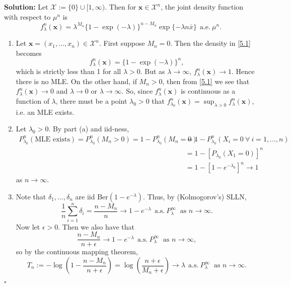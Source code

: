 \documentclass[12pt]{article}
\newcounter{ProofCounter}
\newenvironment{Solution}{\stepcounter{ProofCounter}\textbf{Solution:}}{\hfill$\square$}
\begin{document}
\begin{Solution}
  Let $\mathcal{X} := \{0\} \cup [1,\infty)$. Then for $\bm{x} \in \mathcal{X}^n$, the joint density function with respect to $\mu^n$ is 
  \begin{equation}
    f_{\lambda}^n(\bm{x}) = \lambda^{M_n}\{1 - \exp(-\lambda)\}^{n-M_n}\exp\{-\lambda n\bar{x}\} \ \ \text{a.e.} \ \mu^n.
    \label{5.1}
  \end{equation}
  \begin{enumerate}[label=(\alph*),leftmargin=6mm]
    \item Let $\bm{x} = (x_1, \dots, x_n) \in \mathcal{X}^n$. First suppose $M_n = 0$. Then the density in \eqref{5.1} becomes
      \[
        f_{\lambda}^n(\bm{x}) = \{1 - \exp(-\lambda)\}^n,
      \]
      which is strictly less than 1 for all $\lambda > 0$.
      But as $\lambda \rightarrow \infty$, $f_{\lambda}^n(\bm{x}) \rightarrow 1$. Hence there is no MLE.
      On the other hand, if $M_n > 0$, then from \eqref{5.1} we see that $f_{\lambda}^n(\bm{x}) \rightarrow 0$ and $\lambda \rightarrow 0$ or $\lambda
      \rightarrow \infty$. So, since $f_{\lambda}^n(\bm{x})$ is continuous as a function of $\lambda$, there must be a point $\lambda_0 > 0$ that
      $f_{\lambda_0}^n(\bm{x}) = \sup_{\lambda > 0}f_{\lambda}^n(\bm{x})$, i.e. an MLE exists.

    \item Let $\lambda_0 > 0$. By part (a) and iid-ness,
      \begin{align*}
        P_{\lambda_0}^n\left( \text{MLE exists} \right) = P_{\lambda_0}^n(M_n > 0) = 1 - P_{\lambda_0}^n(M_n = 0) & = 1 - P_{\lambda_0}^n(X_i = 0 \
        \forall \ i = 1,\dots, n) \\
        & = 1 - \left[ P_{\lambda_0}(X_1 = 0) \right]^{n} \\
        & = 1 - \left[ 1 - e^{-\lambda_0} \right]^{n} \longrightarrow 1
      \end{align*}
      as $n \rightarrow \infty$.

    \item Note that $\delta_1, \dots, \delta_n$ are iid Ber$(1 - e^{-\lambda})$. Thus, by (Kolmogorov's) SLLN,
      \[
        \frac{1}{n}\sum_{i=1}^{n}\delta_i = \frac{n - M_n}{n} \longrightarrow 1 - e^{-\lambda} \ \ \text{a.s.} \ P_{\lambda}^{\infty} \ \text{ as } n \rightarrow \infty.
      \]
      Now let $\epsilon > 0$. Then we also have that 
      \[
        \frac{n - M_n}{n + \epsilon} \longrightarrow 1 - e^{-\lambda} \ \ \text{a.s.} \ P_{\lambda}^{\infty} \ \text{ as } n \rightarrow \infty,
      \]
      so by the continuous mapping theorem,
      \[
        T_n := -\log\left( 1 - \frac{n - M_n}{n + \epsilon}\right) = \log\left( \frac{n + \epsilon}{M_n + \epsilon} \right) \longrightarrow \lambda  \
        \ \text{a.s.} \ P_{\lambda}^{\infty} \ \text{ as } n \rightarrow \infty.
      \]


\end{enumerate}
\end{Solution}
\end{document}
